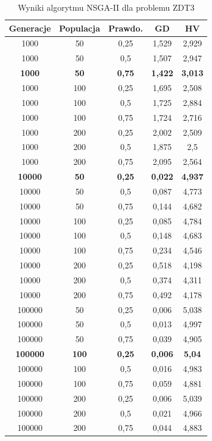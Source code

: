 \documentclass{classrep}
\begin{document}
\begin{table}[H]
\centering
\caption{Wyniki algorytmu NSGA-II dla problemu ZDT3}
\label{tab:NSGAII_ZDT3}
\begin{tabular}{|ccc|c|c|}
\hline
\textbf{Generacje} & \textbf{Populacja} & \textbf{Prawdo.} & \textbf{GD} & \textbf{HV} \\ \hline
1000 & 50 & 0,25 & 1,529 & 2,929 \\ \hline
1000 & 50 & 0,5 & 1,507 & 2,947 \\ \hline
\textbf{1000} & \textbf{50} & \textbf{0,75} & \textbf{1,422} & \textbf{3,013} \\ \hline
1000 & 100 & 0,25 & 1,695 & 2,508 \\ \hline
1000 & 100 & 0,5 & 1,725 & 2,884 \\ \hline
1000 & 100 & 0,75 & 1,724 & 2,716 \\ \hline
1000 & 200 & 0,25 & 2,002 & 2,509 \\ \hline
1000 & 200 & 0,5 & 1,875 & 2,5 \\ \hline
1000 & 200 & 0,75 & 2,095 & 2,564 \\ \hline
\textbf{10000} & \textbf{50} & \textbf{0,25} & \textbf{0,022} & \textbf{4,937} \\ \hline
10000 & 50 & 0,5 & 0,087 & 4,773 \\ \hline
10000 & 50 & 0,75 & 0,144 & 4,682 \\ \hline
10000 & 100 & 0,25 & 0,085 & 4,784 \\ \hline
10000 & 100 & 0,5 & 0,148 & 4,683 \\ \hline
10000 & 100 & 0,75 & 0,234 & 4,546 \\ \hline
10000 & 200 & 0,25 & 0,518 & 4,198 \\ \hline
10000 & 200 & 0,5 & 0,374 & 4,311 \\ \hline
10000 & 200 & 0,75 & 0,492 & 4,178 \\ \hline
100000 & 50 & 0,25 & 0,006 & 5,038 \\ \hline
100000 & 50 & 0,5 & 0,013 & 4,997 \\ \hline
100000 & 50 & 0,75 & 0,039 & 4,905 \\ \hline
\textbf{100000} & \textbf{100} & \textbf{0,25} & \textbf{0,006} & \textbf{5,04} \\ \hline
100000 & 100 & 0,5 & 0,016 & 4,983 \\ \hline
100000 & 100 & 0,75 & 0,059 & 4,881 \\ \hline
100000 & 200 & 0,25 & 0,006 & 5,039 \\ \hline
100000 & 200 & 0,5 & 0,021 & 4,966 \\ \hline
100000 & 200 & 0,75 & 0,044 & 4,883 \\ \hline
\end{tabular}
\end{table}
\end{document}

